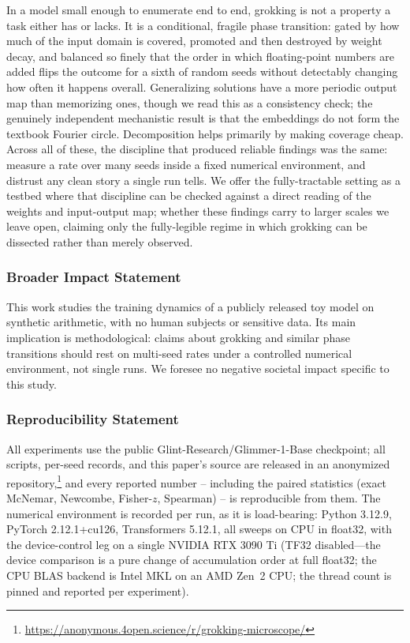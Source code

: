 \documentclass[10pt]{article} %
\begin{document}
In a model small enough to enumerate end to end, grokking is not a property a task either has or
lacks. It is a conditional, fragile phase transition: gated by how much of the input domain is
covered, promoted and then destroyed by weight decay, and balanced so finely that the order in
which floating-point numbers are added flips the outcome for a sixth of random seeds without
detectably changing how often it happens overall. Generalizing solutions have a more periodic
output map than memorizing ones, though we read this as a consistency check; the genuinely
independent mechanistic result is that the embeddings do not form the textbook Fourier circle.
Decomposition helps primarily by making coverage cheap. Across all of these, the discipline that
produced reliable findings was the same: measure a rate over many seeds inside a fixed numerical
environment, and distrust any clean story a single run tells. We offer the fully-tractable setting
as a testbed where that discipline can be checked against a direct reading of the weights and
input-output map; whether these findings carry to larger scales we leave open, claiming only the
fully-legible regime in which grokking can be dissected rather than merely observed.

\subsubsection*{Broader Impact Statement}
This work studies the training dynamics of a publicly released toy model on synthetic arithmetic,
with no human subjects or sensitive data. Its main implication is methodological: claims about
grokking and similar phase transitions should rest on multi-seed rates under a controlled numerical
environment, not single runs. We foresee no negative societal impact specific to this study.

\subsubsection*{Reproducibility Statement}
All experiments use the public Glint-Research/Glimmer-1-Base checkpoint; all scripts, per-seed
records, and this paper's source are released in an anonymized
repository,\footnote{\url{https://anonymous.4open.science/r/grokking-microscope/}} and every
reported number -- including the paired statistics (exact
McNemar, Newcombe, Fisher-$z$, Spearman) -- is reproducible from them. The numerical environment is
recorded per run, as it is load-bearing: Python 3.12.9, PyTorch 2.12.1+cu126, Transformers 5.12.1,
all sweeps on CPU in float32, with the device-control leg on a single NVIDIA RTX 3090 Ti (TF32 disabled---the device comparison is a pure change of accumulation order at full float32; the CPU BLAS backend is Intel MKL on an AMD Zen~2 CPU; the thread count is pinned and reported per experiment).



\end{document}
